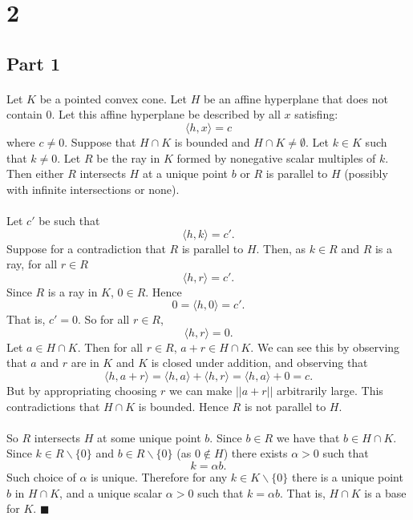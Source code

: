 \documentclass[letterpaper,12pt,oneside,onecolumn]{article}
\begin{document}
\section*{2}
\subsection*{Part 1}
\paragraph{}
Let $K$ be a pointed convex cone. Let $H$ be an affine hyperplane that does not contain $0$. Let this affine hyperplane be described by all $x$ satisfing:
$$\langle h, x \rangle = c $$ where $c \neq 0$. Suppose that $H\cap K$ is bounded and $H \cap K \neq \emptyset$. Let $k \in K$ such that $k \neq 0$. Let $R$ be the ray in $K$ formed by nonegative scalar multiples of $k$. Then either $R$ intersects $H$ at a unique point $b$ or $R$ is parallel to $H$ (possibly with infinite intersections or none).
\paragraph{}
Let $c'$ be such that
$$\langle h, k \rangle = c'.$$ Suppose for a contradiction that $R$ is parallel to $H$. Then, as $k \in R$ and $R$ is a ray, for all $r \in R$
$$\langle h, r \rangle = c'.$$
Since $R$ is a ray in $K$, $0 \in R$. Hence 
$$0 = \langle h, 0 \rangle = c'.$$
That is, $c' = 0$. So for all $r \in R$,
$$\langle h, r \rangle = 0.$$
Let $a \in H \cap K$. Then for all  $r \in R$, $a +r \in H \cap K$. We can see this by observing that $a$ and $r$ are in $K$ and $K$ is closed under addition, and observing that
$$\langle h, a + r \rangle = \langle h, a \rangle +  \langle h, r \rangle = \langle h, a \rangle + 0 = c.$$
But by appropriating choosing $r$ we can make $|| a+ r||$ arbitrarily large. This contradictions that $H\cap K$ is bounded. Hence $R$ is not parallel to $H$.
\paragraph{}
So $R$ intersects $H$ at some unique point $b$. Since $b \in R$ we have that $b \in H \cap K$. Since $k \in R \backslash\{0\}$ and $b \in R \backslash \{0\}$ (as $0\not\in H$) there exists $\alpha > 0$ such that $$k = \alpha b.$$
Such choice of $\alpha$ is unique. Therefore for any $k \in K \backslash\{0\}$ there is a unique point $b$ in $H \cap K$, and a unique scalar $\alpha > 0$ such that $k = \alpha b$. That is, $H \cap K$ is a base for $K$. $\blacksquare$
\end{document}
